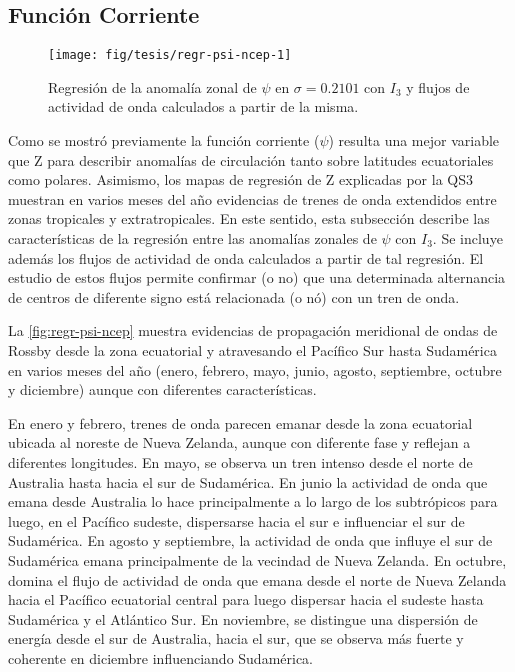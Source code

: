 \documentclass[spanish,a4paper,12pt]{book}
\begin{document}
\subsection{Función Corriente}\label{funcion-corriente-1}

\begin{landscape}\begin{figure}

{\centering \texttt{[image: fig/tesis/regr-psi-ncep-1]} 

}

\caption{Regresión de la anomalía zonal de $\psi$ en $\sigma = 0.2101$ con $I_3$ y flujos de actividad de onda calculados a partir de la misma.}\label{fig:regr-psi-ncep}
\end{figure}
\end{landscape}

Como se mostró previamente la función corriente (\(\psi\)) resulta una
mejor variable que Z para describir anomalías de circulación tanto sobre
latitudes ecuatoriales como polares. Asimismo, los mapas de regresión de
Z explicadas por la QS3 muestran en varios meses del año evidencias de
trenes de onda extendidos entre zonas tropicales y extratropicales. En
este sentido, esta subsección describe las características de la
regresión entre las anomalías zonales de \(\psi\) con \(I_3\). Se
incluye además los flujos de actividad de onda calculados a partir de
tal regresión. El estudio de estos flujos permite confirmar (o no) que
una determinada alternancia de centros de diferente signo está
relacionada (o nó) con un tren de onda.

La \autoref{fig:regr-psi-ncep} muestra evidencias de propagación
meridional de ondas de Rossby desde la zona ecuatorial y atravesando el
Pacífico Sur hasta Sudamérica en varios meses del año (enero, febrero,
mayo, junio, agosto, septiembre, octubre y diciembre) aunque con
diferentes características.

En enero y febrero, trenes de onda parecen emanar desde la zona
ecuatorial ubicada al noreste de Nueva Zelanda, aunque con diferente
fase y reflejan a diferentes longitudes. En mayo, se observa un tren
intenso desde el norte de Australia hasta hacia el sur de Sudamérica. En
junio la actividad de onda que emana desde Australia lo hace
principalmente a lo largo de los subtrópicos para luego, en el Pacífico
sudeste, dispersarse hacia el sur e influenciar el sur de Sudamérica. En
agosto y septiembre, la actividad de onda que influye el sur de
Sudamérica emana principalmente de la vecindad de Nueva Zelanda. En
octubre, domina el flujo de actividad de onda que emana desde el norte
de Nueva Zelanda hacia el Pacífico ecuatorial central para luego
dispersar hacia el sudeste hasta Sudamérica y el Atlántico Sur. En
noviembre, se distingue una dispersión de energía desde el sur de
Australia, hacia el sur, que se observa más fuerte y coherente en
diciembre influenciando Sudamérica.
\end{document}
